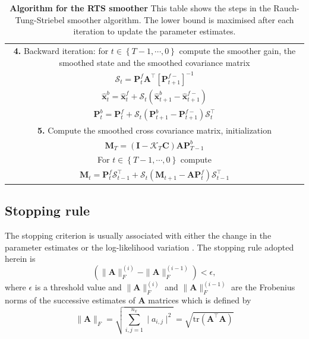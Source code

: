\documentclass[review,authoryear,3p]{elsarticle}
\begin{document}
\begin{table}[!ht]
\begin{tabular}{|c|}
\hline
\multicolumn{1}{|p{16cm}|}{\textbf{4.} Backward iteration: for $t\in\left\lbrace T-1,\cdots,0\right\rbrace $ compute the smoother gain, the smoothed state and the smoothed covariance matrix}\\  
$\mathcal S_{t}=\mathbf P_{t}^{f}\mathbf A^{\top}\left[ \mathbf P_{t +1}^{f-}\right]^{-1}$ \\
 $\hat{\mathbf x}_t^b=\hat{\mathbf x}_t^f+\mathcal S_t(\hat{\mathbf x}_{t+1}^{b}-\hat{\mathbf x}_{t+1}^{f-})$ \\
 $\mathbf P_{t}^{b}=\mathbf P_{t}^{f}+\mathcal S_t(\mathbf P_{t+1}^{b}-\mathbf P_{t+1}^{f-})\mathcal S_t^\top$\\  
\hline
\multicolumn{1}{|p{16cm}|}{\textbf{5.} Compute the smoothed cross covariance matrix, initialization}\\
$\mathbf M_T=(\mathbf I-\mathcal K_T\mathbf C)\mathbf A\mathbf P_{T-1}^b$\\
\multicolumn{1}{|p{16cm}|}{For $t\in\left\lbrace T-1,\cdots,0\right\rbrace $ compute}\\
$\mathbf M_t= \mathbf P_t^{f}\mathcal S_{t-1}^{\top}+\mathcal S_{t}(\mathbf M_{t+1}-\mathbf A\mathbf P_t^{f} )\mathcal S_{t-1}^{\top}$\\
\hline
\end{tabular}
\caption{\textbf{Algorithm for the RTS smoother} This table shows the steps in the  Rauch-Tung-Striebel smoother algorithm. The lower bound is maximised after each iteration to update the parameter estimates.}
\label{alg:MRA-RTS}
\end{table}
\renewcommand{\arraystretch}{1}
\subsection{Stopping rule}
The stopping criterion is usually associated with either the change in the parameter estimates or the log-likelihood variation \cite{McLachlan1997}. The stopping rule adopted herein is
\begin{equation}
 \left(\parallel \mathbf{A} \parallel_{F}^{(i)}-\parallel \mathbf{A} \parallel_{F}^{(i-1)}\right)<\epsilon,
 \end{equation}
 where $\epsilon$ is a threshold value and $\parallel \mathbf{A} \parallel_{F}^{(i)}$ and $ \parallel \mathbf{A} \parallel_{F}^{(i-1)}$ are the Frobenius norms  of the successive estimates of $\mathbf{A} $ matrices which is defined by \citet{Meyer2000}
 \begin{equation}
  \parallel \mathbf{A} \parallel_{F}=\sqrt{\sum_{i,j=1}^{n_x}\mid a_{i,j} \mid^2}=\sqrt{\mathrm{tr} (\mathbf A^{\top}\mathbf A)}
 \end{equation}
\end{document}
